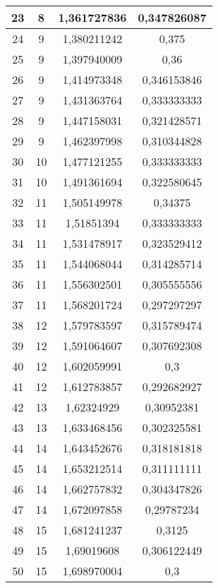 {\begin{minipage}[!h]{0.45\textwidth}
\begin{longtable}{cccc}
23 & 8 & 1,361727836 & 0,347826087 \\ \hline
24 & 9 & 1,380211242 & 0,375 \\ \hline
25 & 9 & 1,397940009 & 0,36 \\ \hline
26 & 9 & 1,414973348 & 0,346153846 \\ \hline
27 & 9 & 1,431363764 & 0,333333333 \\ \hline
28 & 9 & 1,447158031 & 0,321428571 \\ \hline
29 & 9 & 1,462397998 & 0,310344828 \\ \hline
30 & 10 & 1,477121255 & 0,333333333 \\ \hline
31 & 10 & 1,491361694 & 0,322580645 \\ \hline
32 & 11 & 1,505149978 & 0,34375 \\ \hline
33 & 11 & 1,51851394 & 0,333333333 \\ \hline
34 & 11 & 1,531478917 & 0,323529412 \\ \hline
35 & 11 & 1,544068044 & 0,314285714 \\ \hline
36 & 11 & 1,556302501 & 0,305555556 \\ \hline
37 & 11 & 1,568201724 & 0,297297297 \\ \hline
38 & 12 & 1,579783597 & 0,315789474 \\ \hline
39 & 12 & 1,591064607 & 0,307692308 \\ \hline
40 & 12 & 1,602059991 & 0,3 \\ \hline
41 & 12 & 1,612783857 & 0,292682927 \\ \hline
42 & 13 & 1,62324929 & 0,30952381 \\ \hline
43 & 13 & 1,633468456 & 0,302325581 \\ \hline
44 & 14 & 1,643452676 & 0,318181818 \\ \hline
45 & 14 & 1,653212514 & 0,311111111 \\ \hline
46 & 14 & 1,662757832 & 0,304347826 \\ \hline
47 & 14 & 1,672097858 & 0,29787234 \\ \hline
48 & 15 & 1,681241237 & 0,3125 \\ \hline
49 & 15 & 1,69019608 & 0,306122449 \\ \hline
50 & 15 & 1,698970004 & 0,3 \\ \hline
\end{longtable}
\end{minipage}
\begin{minipage}[!h]{0.45\textwidth}\centering
\tiny
\begin{longtable}{cccc} \hline

\end{longtable}
\end{minipage}}

